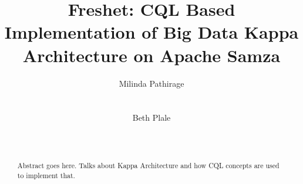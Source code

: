 \documentclass{sig-alternate}
\begin{document}
%

\title{Freshet: CQL Based Implementation of Big Data Kappa Architecture on Apache Samza}


\author{
\alignauthor
Milinda Pathirage\\
       \\
       \\
\alignauthor
Beth Plale\\
       \\
       \\
}

\maketitle
\begin{abstract}
  Abstract goes here. Talks about Kappa Architecture and how CQL concepts are used to implement that.
\end{abstract}
\end{document}
